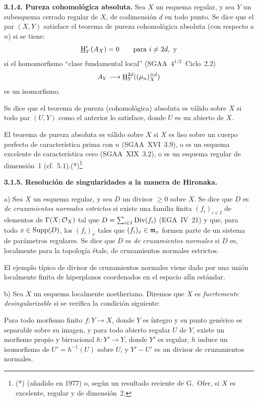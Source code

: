 \textbf{3.1.4. Pureza cohomológica absoluta.} Sea $X$ un esquema regular, y sea $Y$ un subesquema cerrado regular de $X$, de codimensión $d$ en todo punto. Se dice que el par $(X,Y)$ satisface el teorema de pureza cohomológica absoluta (con respecto a $n$) si se tiene:
\[
\underline{\mathrm{H}}^i_Y(A_X) = 0 \qquad \text{para } i \neq 2d, \text{ y}
\]
si el homomorfismo \textquotedblleft clase fundamental local\textquotedblright{} (SGAA~$4^{1/2}$~Ciclo~2.2)
\[
A_Y \longrightarrow \underline{\mathrm{H}}^{2d}_Y((\mu_n)^{\otimes d}_X)
\]
es un isomorfismo.

Se dice que el teorema de pureza (cohomológica) absoluta es válido sobre $X$ si todo par $(U,Y)$ como el anterior lo satisface, donde $U$ es un abierto de $X$.

El teorema de pureza absoluta es válido sobre $X$ si $X$ es liso sobre un cuerpo perfecto de característica prima con $n$ (SGAA~XVI~3.9), o es un esquema excelente de característica cero (SGAA~XIX~3.2), o es un esquema regular de dimensión~1 (cf.~5.1).(*)\footnote{(*) (añadido en 1977) o, según un resultado reciente de G.~Ofer, si $X$ es excelente, regular y de dimensión~2.}

\textbf{3.1.5. Resolución de singularidades a la manera de Hironaka.}

a) Sea $X$ un esquema regular, y sea $D$ un divisor $\geqslant 0$ sobre $X$. Se dice que $D$ es \emph{de cruzamientos normales estrictos} si existe una familia finita $(f_i)_{i \in I}$ de elementos de $\Gamma(X; \mathcal{O}_X)$ tal que $D = \sum_{i \in I} \operatorname{Div}(f_i)$ (EGA~IV~21) y que, para todo $x \in \operatorname{Supp}(D)$, los $(f_i)_x$ tales que $(f_i)_x \in \mathfrak m_x$ formen parte de un sistema de parámetros regulares. Se dice que $D$ es \emph{de cruzamientos normales} si $D$ es, localmente para la topología étale, de cruzamientos normales estrictos.

El ejemplo típico de divisor de cruzamientos normales viene dado por una unión localmente finita de hiperplanos coordenados en el espacio afín estándar.

b) Sea $X$ un esquema localmente noetheriano. Diremos que $X$ es \emph{fuertemente desingularizable} si se verifica la condición siguiente:

Para todo morfismo finito $f : Y \to X$, donde $Y$ es íntegro y su punto genérico es separable sobre su imagen, y para todo abierto regular $U$ de $Y$, existe un morfismo propio y birracional $h : Y' \to Y$, donde $Y'$ es regular, $h$ induce un isomorfismo de $U' = h^{-1}(U)$ sobre $U$, y $Y' - U'$ es un divisor de cruzamientos normales.

